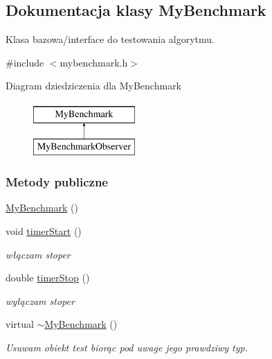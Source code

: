 \hypertarget{class_my_benchmark}{\subsection{Dokumentacja klasy My\-Benchmark}
\label{class_my_benchmark}
}


Klasa bazowa/interface do testowania algorytmu.  




{\ttfamily \#include $<$mybenchmark.\-h$>$}

Diagram dziedziczenia dla My\-Benchmark\begin{figure}[H]
\begin{center}
\leavevmode
\includegraphics[height=2.000000cm]{class_my_benchmark}
\end{center}
\end{figure}
\subsubsection*{Metody publiczne}
\begin{DoxyCompactItemize}
\item 
\hyperlink{class_my_benchmark_a7f3739e8b61939627c0f63948a9975ca}{My\-Benchmark} ()
\item 
void \hyperlink{class_my_benchmark_a802577db97fd440a3920add30c35a676}{timer\-Start} ()
\begin{DoxyCompactList}\small\item\em włączam stoper \end{DoxyCompactList}\item 
double \hyperlink{class_my_benchmark_a7e3fa28fab999435bd4c51d915e42809}{timer\-Stop} ()
\begin{DoxyCompactList}\small\item\em wyłączam stoper \end{DoxyCompactList}\item 
virtual \hyperlink{class_my_benchmark_a00de82c40680b41065eb402ac90f1736}{$\sim$\-My\-Benchmark} ()
\begin{DoxyCompactList}\small\item\em Usuwam obiekt test biorąc pod uwage jego prawdziwy typ. \end{DoxyCompactList}\end{DoxyCompactItemize}
